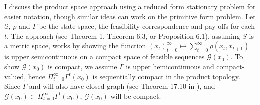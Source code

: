 \documentclass[12pt]{ectaart}
\newcommand{\1}{\mathbbm 1}
\theoremstyle{plain}
\theoremstyle{definition}
\begin{document}
	 I discuss the product space approach using a reduced form stationary problem for easier notation, though similar ideas can work on the primitive form problem. Let $\mathbb{S}$, $\rho$ and $\Gamma$ be the state space, the feasibility correspondence and pay-offs for each $t$. The approach (see \cite{LeVan2002a} Theorem 1, \cite{Acemoglu2009} Theorem 6.3, or \cite{Kamihigashi2017} Proposition 6.1), assuming $S$ is a metric space, works by showing the function $(x_{t})_{t=0}^{\infty}\mapsto \sum_{t=0}^{\infty}\rho(x_{t},x_{t+1})$ is upper semicontinuous on a compact space of feasible sequences $\mathcal{G}(x_{0})$. To show $\mathcal{G}(x_{0})$ is compact, we assume $\Gamma$ is upper hemicontinuous and compact-valued, hence $\Pi_{t=0}^{\infty}\Gamma^{t}(x_{0})$ is sequentially compact in the product topology. Since $\Gamma$ and will also have closed graph (see Theorem 17.10 in \cite{Aliprantis2005}), and $\mathcal{G}(x_{0})\subset \Pi_{t=0}^{\infty}\Gamma^{t}(x_{0})$, $\mathcal{G}(x_{0})$ will be compact.
	 
	 
	 
	 


 	
 	
 	
 	
 	
\end{document}

